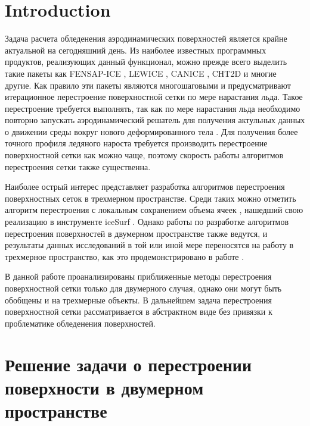 \documentclass[
11pt,%
tightenlines,%
twoside,%
onecolumn,%
nofloats,%
nobibnotes,%
nofootinbib,%
superscriptaddress,%
noshowpacs,%
centertags]%
{revtex4}
\begin{document}

\maketitle


\section{Introduction}

Задача расчета обледенения аэродинамических поверхностей является крайне актуальной на сегодняшний день.
Из наиболее известных программных продуктов, реализующих данный функционал, можно прежде всего выделить такие пакеты как FENSAP-ICE \cite{Bourgault_FENSAP}, LEWICE \cite{Bidwell_LEWICE}, CANICE \cite{Pueyo_CANICE}, CHT2D \cite{Pueyo_CHT2D} и многие другие.
Как правило эти пакеты являются многошаговыми и предусматривают итерационное перестроение поверхностной сетки по мере нарастания льда.
Такое перестроение требуется выполнять, так как по мере нарастания льда необходимо повторно запускать аэродинамический решатель для получения актульных данных о движении среды вокруг нового деформированного тела \cite{Ozgen, Beaugendre}.
Для получения более точного профиля ледяного нароста требуется производить перестроение поверхностной сетки как можно чаще, поэтому скорость работы алгоритмов перестроения сетки также существенна.

Наиболее острый интерес представляет разработка алгоритмов перестроения поверхностных сеток в трехмерном пространстве.
Среди таких можно отметить алгоритм перестроения с локальным сохранением объема ячеек \cite{Jiao}, нашедший свою реализацию в инструменте iceSurf \cite{Thompson}.
Однако работы по разработке алгоритмов перестроения поверхностей в двумерном пространстве также ведутся, и результаты данных исследований в той или иной мере переносятся на работу в трехмерное пространство, как это продемонстрировано в работе \cite{Pueyo}.

В данной работе проанализированы приближенные методы перестроения поверхностной сетки только для двумерного случая, однако они могут быть обобщены и на трехмерные объекты.
В дальнейшем задача перестроения поверхностной сетки рассматривается в абстрактном виде без привязки к проблематике обледенения поверхностей.

\section{Решение задачи о перестроении поверхности в двумерном пространстве}
\end{document}
